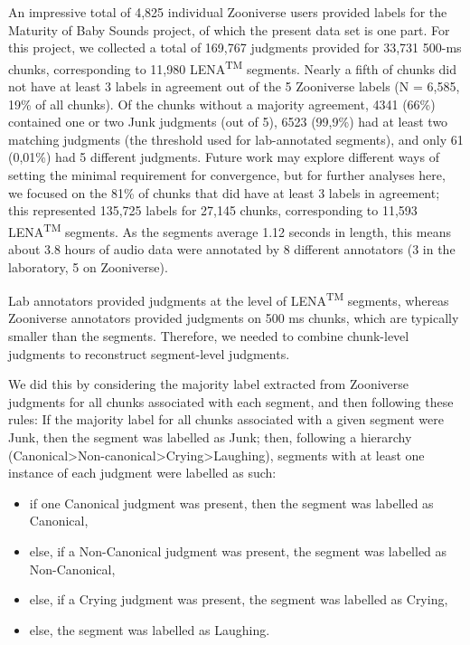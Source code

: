 \documentclass[english,,man]{apa6}
\providecommand{\tightlist}{%
  \setlength{\itemsep}{0pt}\setlength{\parskip}{0pt}}
\begin{document}
An impressive total of 4,825 individual Zooniverse users provided labels for the Maturity of Baby Sounds project, of which the present data set is one part. For this project, we collected a total of 169,767 judgments provided for 33,731 500-ms chunks, corresponding to 11,980 LENA\textsuperscript{TM} segments. Nearly a fifth of chunks did not have at least 3 labels in agreement out of the 5 Zooniverse labels (N = 6,585, 19\% of all chunks). Of the chunks without a majority agreement, 4341 (66\%) contained one or two Junk judgments (out of 5), 6523 (99,9\%) had at least two matching judgments (the threshold used for lab-annotated segments), and only 61 (0,01\%) had 5 different judgments. Future work may explore different ways of setting the minimal requirement for convergence, but for further analyses here, we focused on the 81\% of chunks that did have at least 3 labels in agreement; this represented 135,725 labels for 27,145 chunks, corresponding to 11,593 LENA\textsuperscript{TM} segments. As the segments average 1.12 seconds in length, this means about 3.8 hours of audio data were annotated by 8 different annotators (3 in the laboratory, 5 on Zooniverse).

Lab annotators provided judgments at the level of LENA\textsuperscript{TM} segments, whereas Zooniverse annotators provided judgments on 500 ms chunks, which are typically smaller than the segments. Therefore, we needed to combine chunk-level judgments to reconstruct segment-level judgments.

We did this by considering the majority label extracted from Zooniverse judgments for all chunks associated with each segment, and then following these rules: If the majority label for all chunks associated with a given segment were Junk, then the segment was labelled as Junk; then, following a hierarchy (Canonical\textgreater{}Non-canonical\textgreater{}Crying\textgreater{}Laughing), segments with at least one instance of each judgment were labelled as such:

\begin{itemize}
\tightlist
\item
  if one Canonical judgment was present, then the segment was labelled as Canonical,
\item
  else, if a Non-Canonical judgment was present, the segment was labelled as Non-Canonical,
\item
  else, if a Crying judgment was present, the segment was labelled as Crying,
\item
  else, the segment was labelled as Laughing.
\end{itemize}
\end{document}

